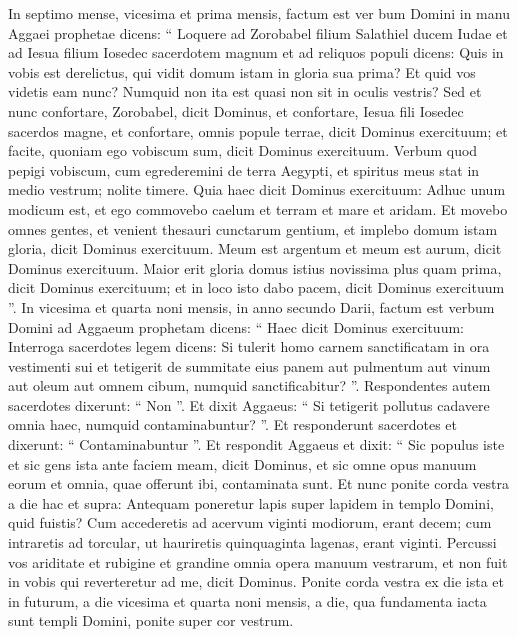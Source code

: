 \begin{biblechapter}
\begin{biblechapter}
\verse In septimo mense, vicesima et prima mensis, factum est ver bum Domini in manu Aggaei prophetae dicens: 
\verse “ Loquere ad Zorobabel filium Salathiel ducem Iudae et ad Iesua filium Iosedec sacerdotem magnum et ad reliquos populi dicens: 
\verse Quis in vobis est derelictus, qui vidit domum istam in gloria sua prima? Et quid vos videtis eam nunc? Numquid non ita est quasi non sit in oculis vestris? 
\verse Sed et nunc confortare, Zorobabel, dicit Dominus, et confortare, Iesua fili Iosedec sacerdos magne, et confortare, omnis popule terrae, dicit Dominus exercituum; et facite, quoniam ego vobiscum sum, dicit Dominus exercituum. 
\verse Verbum quod pepigi vobiscum, cum egrederemini de terra Aegypti, et spiritus meus stat in medio vestrum; nolite timere. 
\verse Quia haec dicit Dominus exercituum: Adhuc unum modicum est, et ego commovebo caelum et terram et mare et aridam. 
 \verse Et movebo omnes gentes, et venient thesauri cunctarum gentium, et implebo domum istam gloria, dicit Dominus exercituum. 
\verse Meum est argentum et meum est aurum, dicit Dominus exercituum. 
\verse Maior erit gloria domus istius novissima plus quam prima, dicit Dominus exercituum; et in loco isto dabo pacem, dicit Dominus exercituum ”.
 \verse In vicesima et quarta noni mensis, in anno secundo Darii, factum est verbum Domini ad Aggaeum prophetam dicens: 
\verse “ Haec dicit Dominus exercituum: Interroga sacerdotes legem dicens: 
\verse Si tulerit homo carnem sanctificatam in ora vestimenti sui et tetigerit de summitate eius panem aut pulmentum aut vinum aut oleum aut omnem cibum, numquid sanctificabitur? ”. Respondentes autem sacerdotes dixerunt: “ Non ”. 
\verse Et dixit Aggaeus: “ Si tetigerit pollutus cadavere omnia haec, numquid contaminabuntur? ”. Et responderunt sacerdotes et dixerunt: “ Contaminabuntur ”. 
\verse Et respondit Aggaeus et dixit: “ Sic populus iste et sic gens ista ante faciem meam, dicit Dominus, et sic omne opus manuum eorum et omnia, quae offerunt ibi, contaminata sunt.
 \verse Et nunc ponite corda vestra a die hac et supra: Antequam poneretur lapis super lapidem in templo Domini, 
\verse quid fuistis? Cum accederetis ad acervum viginti modiorum, erant decem; cum intraretis ad torcular, ut hauriretis quinquaginta lagenas, erant viginti. 
\verse Percussi vos ariditate et rubigine et grandine omnia opera manuum vestrarum, et non fuit in vobis qui reverteretur ad me, dicit Dominus. 
\verse Ponite corda vestra ex die ista et in futurum, a die vicesima et quarta noni mensis, a die, qua fundamenta iacta sunt templi Domini, ponite super cor vestrum. 

\end{biblechapter}
\end{biblechapter}
